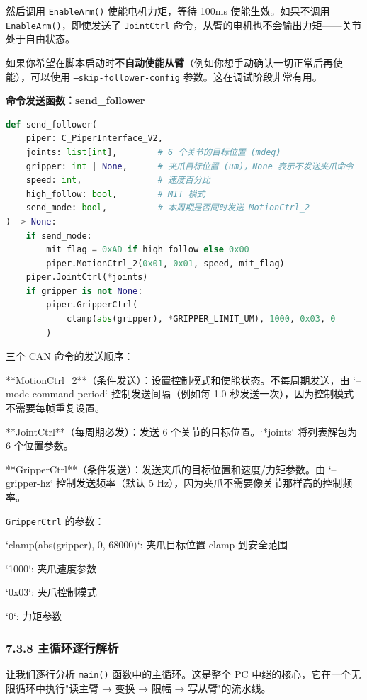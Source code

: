 \documentclass[UTF8,a4paper,11pt]{ctexart}
\begin{document}
{然后调用 \texttt{EnableArm()} 使能电机力矩，等待 100ms 使能生效。如果不调用 \texttt{EnableArm()}，即使发送了 \texttt{JointCtrl} 命令，从臂的电机也不会输出力矩——关节处于自由状态。

如果你希望在脚本启动时\textbf{不自动使能从臂}（例如你想手动确认一切正常后再使能），可以使用 \texttt{--skip-follower-config} 参数。这在调试阶段非常有用。

\textbf{命令发送函数：send_follower}

\begin{lstlisting}[language=python]
def send_follower(
    piper: C_PiperInterface_V2,
    joints: list[int],        # 6 个关节的目标位置 (mdeg)
    gripper: int | None,      # 夹爪目标位置 (um)，None 表示不发送夹爪命令
    speed: int,               # 速度百分比
    high_follow: bool,        # MIT 模式
    send_mode: bool,          # 本周期是否同时发送 MotionCtrl_2
) -> None:
    if send_mode:
        mit_flag = 0xAD if high_follow else 0x00
        piper.MotionCtrl_2(0x01, 0x01, speed, mit_flag)
    piper.JointCtrl(*joints)
    if gripper is not None:
        piper.GripperCtrl(
            clamp(abs(gripper), *GRIPPER_LIMIT_UM), 1000, 0x03, 0
        )
\end{lstlisting}

三个 CAN 命令的发送顺序：
\item[1] **MotionCtrl_2**（条件发送）：设置控制模式和使能状态。不每周期发送，由 `--mode-command-period` 控制发送间隔（例如每 1.0 秒发送一次），因为控制模式不需要每帧重复设置。
\item[2] **JointCtrl**（每周期必发）：发送 6 个关节的目标位置。`*joints` 将列表解包为 6 个位置参数。
\item[3] **GripperCtrl**（条件发送）：发送夹爪的目标位置和速度/力矩参数。由 `--gripper-hz` 控制发送频率（默认 5 Hz），因为夹爪不需要像关节那样高的控制频率。

\texttt{GripperCtrl} 的参数：
\item `clamp(abs(gripper), 0, 68000)`: 夹爪目标位置 clamp 到安全范围
\item `1000`: 夹爪速度参数
\item `0x03`: 夹爪控制模式
\item `0`: 力矩参数

\subsubsection{7.3.8 主循环逐行解析}

让我们逐行分析 \texttt{main()} 函数中的主循环。这是整个 PC 中继的核心，它在一个无限循环中执行"读主臂 → 变换 → 限幅 → 写从臂"的流水线。

}
\end{document}
